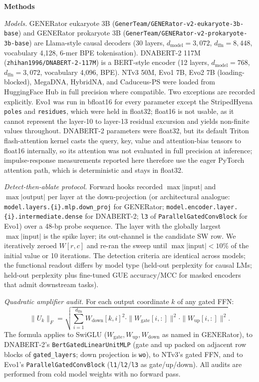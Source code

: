 \documentclass[11pt]{article}
\begin{document}
\textbf{Methods}

\textit{Models.}
GENERator eukaryote 3B
(\texttt{GenerTeam/GENERator-v2-eukaryote-3b-base}) and GENERator
prokaryote 3B (\texttt{GenerTeam/GENERator-v2-prokaryote-3b-base})
are Llama-style causal decoders (30 layers, $d_{\text{model}} =
3{,}072$, $d_{\text{ffn}} = 8{,}448$, vocabulary 4{,}128, 6-mer BPE
tokenisation). DNABERT-2 117M (\texttt{zhihan1996/DNABERT-2-117M})
is a BERT-style encoder (12 layers, $d_{\text{model}} = 768$,
$d_{\text{ffn}} = 3{,}072$, vocabulary 4{,}096, BPE). NTv3 50M,
Evo1 7B, Evo2 7B (loading-blocked), MegaDNA, HybridNA, and
Caduceus-PS were loaded from HuggingFace Hub in full precision
where compatible. Two exceptions are recorded explicitly. Evo1 was
run in bfloat16 for every parameter except the StripedHyena
\texttt{poles} and \texttt{residues}, which were held in float32;
float16 is not usable, as it cannot represent the layer-10 to
layer-13 residual excursion and yields non-finite values throughout.
DNABERT-2 parameters were float32, but its default Triton
flash-attention kernel casts the query, key, value and attention-bias
tensors to float16 internally, so its attention was not evaluated in
full precision at inference; impulse-response measurements reported
here therefore use the eager PyTorch attention path, which is
deterministic and stays in float32.

\textit{Detect-then-ablate protocol.}
Forward hooks recorded $\max|\mathrm{input}|$ and
$\max|\mathrm{output}|$ per layer at the down-projection (or
architectural analogue: \texttt{model.layers.\{i\}.mlp.down\_proj}
for GENERator; \texttt{model.encoder.layer.\{i\}.intermediate.dense}
for DNABERT-2; \texttt{l3} of \texttt{ParallelGatedConvBlock} for
Evo1) over a 48-bp probe sequence. The layer with the globally
largest $\max|\mathrm{input}|$ is the spike layer; its out-channel
is the candidate SW row. We iteratively zeroed $W[r,c]$ and re-ran
the sweep until $\max|\mathrm{input}| < 10\%$ of the initial value
or 10 iterations. The detection criteria are identical across
models; the functional readout differs by model type (held-out
perplexity for causal LMs; held-out perplexity plus fine-tuned GUE
accuracy/MCC for masked encoders that admit downstream tasks).

\textit{Quadratic amplifier audit.}
For each output coordinate $k$ of any gated FFN:
\[
\|U_k\|_F
= \sqrt{\sum_{i=1}^{d_{\text{ffn}}}
  W_{\text{down}}[k,i]^2
  \cdot \|W_{\text{gate}}[i,:]\|^2
  \cdot \|W_{\text{up}}[i,:]\|^2}.
\]
The formula applies to SwiGLU
($W_{\text{gate}}, W_{\text{up}}, W_{\text{down}}$ as named in
GENERator), to DNABERT-2's \texttt{BertGatedLinearUnitMLP} (gate and
up packed on adjacent row blocks of \texttt{gated\_layers}; down
projection is \texttt{wo}), to NTv3's gated FFN, and to Evo1's
\texttt{ParallelGatedConvBlock} (\texttt{l1}/\texttt{l2}/\texttt{l3}
as gate/up/down). All audits are performed from cold model weights
with no forward pass.
\end{document}
